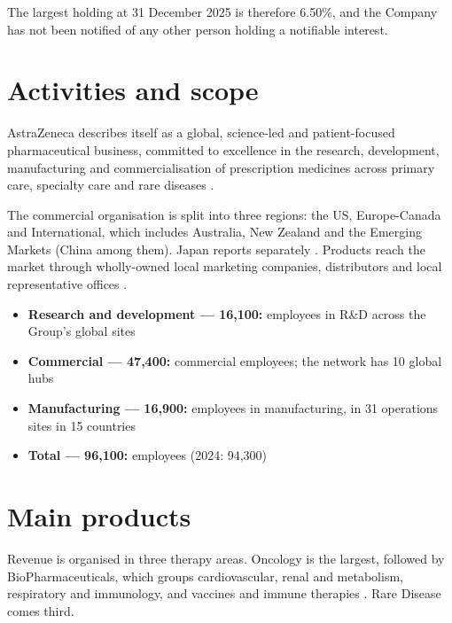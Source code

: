 The largest holding at 31 December 2025 is therefore 6.50\%, and the Company has not been notified of any other person holding a notifiable interest.

\section{Activities and scope}

AstraZeneca describes itself as a global, science-led and patient-focused pharmaceutical business, committed to excellence in the research, development, manufacturing and commercialisation of prescription medicines across primary care, specialty care and rare diseases \cite[p.~8]{AR}.

The commercial organisation is split into three regions: the US, Europe-Canada and International, which includes Australia, New Zealand and the Emerging Markets (China among them). Japan reports separately \cite[p.~32]{AR}. Products reach the market through wholly-owned local marketing companies, distributors and local representative offices \cite[p.~32]{AR}.

\begin{itemize}[leftmargin=*]
\item \textbf{Research and development --- 16,100:} employees in R\&D across the Group's global sites \cite[p.~27]{AR}
\item \textbf{Commercial --- 47,400:} commercial employees; the network has 10 global hubs \cite[p.~27]{AR}
\item \textbf{Manufacturing --- 16,900:} employees in manufacturing, in 31 operations sites in 15 countries \cite[p.~27]{AR}
\item \textbf{Total --- 96,100:} employees (2024: 94,300) \cite[p.~27]{AR}
\end{itemize}

\section{Main products}

Revenue is organised in three therapy areas. Oncology is the largest, followed by BioPharmaceuticals, which groups cardiovascular, renal and metabolism, respiratory and immunology, and vaccines and immune therapies \cite[pp.~2, 4]{AR}. Rare Disease comes third.

